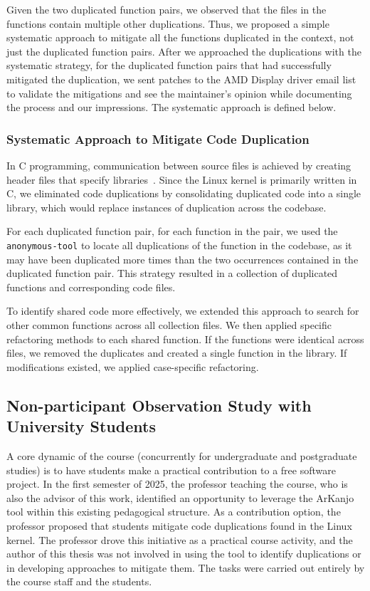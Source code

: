 Given the two duplicated function pairs, we observed that the files in the functions 
contain multiple other duplications. Thus, we proposed a simple systematic approach 
to mitigate all the functions duplicated in the context, not just the duplicated 
function pairs. 
After we approached the duplications with the systematic strategy, for the duplicated 
function pairs that had successfully mitigated the duplication, we sent patches to the 
AMD Display driver email list to validate the mitigations and see the maintainer's opinion 
while documenting the process and our impressions.
The systematic approach is defined below. 

\subsubsection{Systematic Approach to Mitigate Code Duplication}
\label{subsubsec:systematic}

In C programming, communication between source files is achieved by creating header files that specify 
libraries~\cite{Cbook}. Since the Linux kernel is primarily written in C, we eliminated code duplications 
by consolidating duplicated code into a single library, which would replace instances of 
duplication across the codebase.

For each duplicated function pair, for each function in the pair, we used the \texttt{anonymous-tool} to locate all duplications of the function in the codebase, as it may have been duplicated more times than the two occurrences contained in the duplicated function pair. 
This strategy resulted in a collection of duplicated functions and corresponding code files.

To identify shared code more effectively, we extended this approach to search for other common 
functions across all collection files. We then applied specific refactoring methods to each shared 
function. If the functions were identical across files, we removed the duplicates and created a single 
function in the library. If modifications existed, we applied case-specific refactoring.

\subsection{Non-participant Observation Study with University Students}

A core dynamic of the course (concurrently for undergraduate and postgraduate studies) is to 
have students make a practical contribution to a free software project. In the first semester of 
2025, the professor teaching the course, who is also the advisor of this work, identified an 
opportunity to leverage the ArKanjo tool within this existing pedagogical structure. 
As a contribution option, the professor proposed that students mitigate code duplications found 
in the Linux kernel. The professor drove this initiative as a practical course activity, 
and the author of this thesis was not involved in using the tool to identify duplications or 
in developing approaches to mitigate them. The tasks were carried out entirely by the course 
staff and the students.


